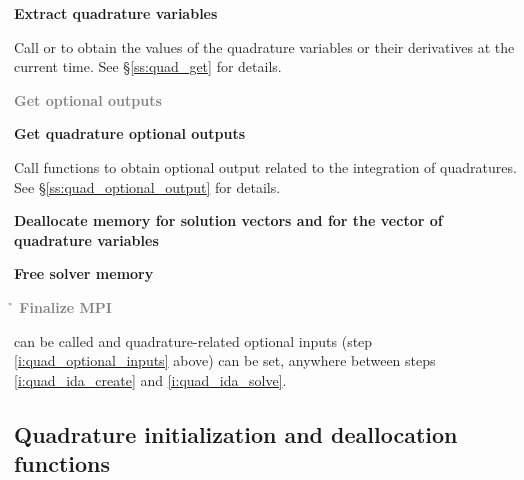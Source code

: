 {\begin{Steps}
\item
  {\bf Extract quadrature variables}

  Call  or  to obtain the values of the quadrature 
  variables or their derivatives at the current time. See \S\ref{ss:quad_get} for details.

\item
  \textcolor{gray}{\bf Get optional outputs}

\item
  {\bf Get quadrature optional outputs}

  Call  functions to obtain optional output related to
  the integration of quadratures.
  See \S\ref{ss:quad_optional_output} for details.

\item
  {\bf Deallocate memory for solution vectors and for the vector of quadrature variables}
  
\item
  {\bf Free solver memory}

\item 
  \textcolor{gray}{\bf {\p} {\h} Finalize MPI}
  
\end{Steps}
 can be called and quadrature-related optional inputs 
(step \ref{i:quad_optional_inputs} above) can be set, anywhere between steps 
\ref{i:quad_ida_create} and \ref{i:quad_ida_solve}.


\subsection{Quadrature initialization and deallocation functions}\label{ss:quad_init}

}
